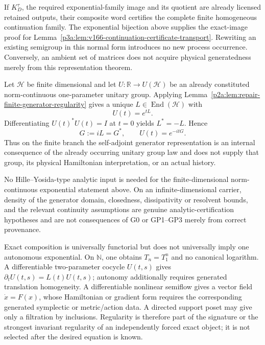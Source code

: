 \documentclass[12pt,a4paper]{article}
\begin{document}
\begin{corollary}
\label{p3a:cor:v166-finite-normal-form-certificate}
If \(K_D^\tau\), the required exponential-family image and its quotient
are already licensed retained outputs, their composite word certifies the
complete finite homogeneous continuation family. The exponential bijection
above supplies the exact-image proof for
Lemma~\ref{p3a:lem:v166-continuation-certificate-transport}.
Rewriting an existing semigroup in this normal form introduces no new process
occurrence. Conversely, an ambient set of matrices does not acquire physical
generatedness merely from this representation theorem.
\end{corollary}


\begin{corollary}
\label{p3a:cor:v149-finite-unitary-generator}
Let \(\mathcal H\) be finite dimensional and let
\(U:\mathbb R\to U(\mathcal H)\) be an already constituted norm-continuous
one-parameter unitary group.  Applying
Lemma~\ref{p2a:lem:repair-finite-generator-regularity} gives a unique
\(L\in\operatorname{End}(\mathcal H)\)
with
\[
 U(t)=e^{tL}.
\]
Differentiating \(U(t)^*U(t)=I\) at \(t=0\) yields
\(L^*=-L\).  Hence
\[
 \boxed{G:=iL=G^*,\qquad U(t)=e^{-itG}.}
\]
Thus on the finite branch the self-adjoint generator representation is an
internal consequence of the already occurring unitary group law and does not
supply that group, its physical Hamiltonian interpretation, or an actual
history.
\end{corollary}

\begin{remark}
\label{p3a:rem:v149-finite-continuum-semigroup-status}
No Hille--Yosida-type analytic input is needed for the finite-dimensional
norm-continuous exponential statement above.  On an infinite-dimensional
carrier, density of the generator domain, closedness, dissipativity or
resolvent bounds, and the relevant continuity assumptions are genuine
analytic-certification hypotheses and are not consequences of G0 or
GP1--GP3 merely from correct provenance.
\end{remark}

\begin{remark}
\label{p3a:rem:continuation-generator-boundary}
Exact composition is universally functorial but does not universally imply
one autonomous exponential.  On \(\mathbb N\), one obtains
\(T_n=T_1^n\) and no canonical logarithm.  A differentiable two-parameter
cocycle \(U(t,s)\) gives
\(\partial_tU(t,s)=L(t)U(t,s)\); autonomy additionally requires generated
translation homogeneity.  A differentiable nonlinear semiflow gives a vector
field \(\dot x=F(x)\), whose Hamiltonian or gradient form requires the
corresponding generated symplectic or metric/action data.  A directed support
poset may give only a filtration by inclusions.  Regularity is therefore part
of the signature or the strongest invariant regularity of an independently
forced exact object; it is not selected after the desired equation is known.
\end{remark}
\end{document}
